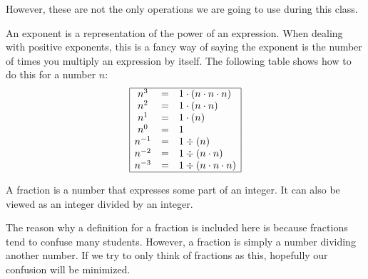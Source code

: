 
However, these are not the only operations we are going to use during this class. 

\begin{defn}[Exponent]
An exponent is a representation of the power of an expression. When dealing with positive exponents, this is a fancy way of saying the exponent is the number of times you multiply an expression by itself. The following table shows how to do this for a number $n$:
$$
\begin{array}{|ccl|}
\hline 
n^3 & = & 1 \cdot (n \cdot n \cdot n) \\
n^2 & = & 1 \cdot (n \cdot n) \\
n^1 & = & 1 \cdot( n )\\
n^0 & = & 1 \\
n^{-1} & = & 1 \div (n) \\
n^{-2} & = & 1 \div (n \cdot n) \\
n^{-3} & = & 1 \div (n \cdot n \cdot n)\\
\hline
\end{array}
$$ 
\end{defn}






\begin{defn}[Fraction]
	A fraction is a number that expresses some part of an integer. It can also be viewed as an integer divided by an integer. 
\end{defn}

The reason why a definition for a fraction is included here is because fractions tend to confuse many students. However, a fraction is simply a number dividing another number. If we try to only think of fractions as this, hopefully our confusion will be minimized. 
